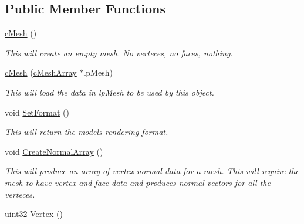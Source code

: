 \subsection*{Public Member Functions}
\begin{DoxyCompactItemize}
\item 
\hypertarget{classc_mesh_a1b689b9d00f34fe7e4cbf8910bb310f9}{
\hyperlink{classc_mesh_a1b689b9d00f34fe7e4cbf8910bb310f9}{cMesh} ()}
\label{classc_mesh_a1b689b9d00f34fe7e4cbf8910bb310f9}

\begin{DoxyCompactList}\small\item\em This will create an empty mesh. No verteces, no faces, nothing. \end{DoxyCompactList}\item 
\hypertarget{classc_mesh_ae24161941f8538d55caa144d76b535bc}{
\hyperlink{classc_mesh_ae24161941f8538d55caa144d76b535bc}{cMesh} (\hyperlink{classc_mesh_array}{cMeshArray} $\ast$lpMesh)}
\label{classc_mesh_ae24161941f8538d55caa144d76b535bc}

\begin{DoxyCompactList}\small\item\em This will load the data in lpMesh to be used by this object. \end{DoxyCompactList}\item 
\hypertarget{classc_mesh_a8dd2a8840d8e2c6aaefa95884a2f9f68}{
void \hyperlink{classc_mesh_a8dd2a8840d8e2c6aaefa95884a2f9f68}{SetFormat} ()}
\label{classc_mesh_a8dd2a8840d8e2c6aaefa95884a2f9f68}

\begin{DoxyCompactList}\small\item\em This will return the models rendering format. \end{DoxyCompactList}\item 
\hypertarget{classc_mesh_a5f35c2b9245d765b7958f91379d63e7d}{
void \hyperlink{classc_mesh_a5f35c2b9245d765b7958f91379d63e7d}{CreateNormalArray} ()}
\label{classc_mesh_a5f35c2b9245d765b7958f91379d63e7d}

\begin{DoxyCompactList}\small\item\em This will produce an array of vertex normal data for a mesh. This will require the mesh to have vertex and face data and produces normal vectors for all the verteces. \end{DoxyCompactList}\item 
\hypertarget{classc_mesh_a1a58ae1ab68b816b36188ac769ac50fd}{
uint32 \hyperlink{classc_mesh_a1a58ae1ab68b816b36188ac769ac50fd}{Vertex} ()}
\label{classc_mesh_a1a58ae1ab68b816b36188ac769ac50fd}


\end{DoxyCompactItemize}
